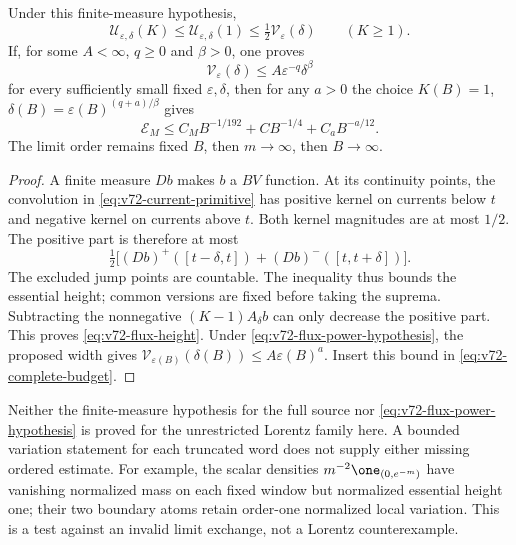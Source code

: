 \begin{proposition}
\label{prop:v72-flux-height}
Under this finite-measure hypothesis,
\begin{equation}\label{eq:v72-flux-height}
 \mathcal U_{\varepsilon,\delta}(K)
           \le\mathcal U_{\varepsilon,\delta}(1)
           \le\tfrac12\mathcal V_\varepsilon(\delta)
                  \qquad(K\ge1).
\end{equation}
If, for some $A<\infty$, $q\ge0$ and $\beta>0$, one proves
\begin{equation}\label{eq:v72-flux-power-hypothesis}
 \mathcal V_\varepsilon(\delta)
                  \le A\varepsilon^{-q}\delta^\beta
\end{equation}
for every sufficiently small fixed $\varepsilon,\delta$, then
for any $a>0$ the choice
$K(B)=1$, $\delta(B)=\varepsilon(B)^{(q+a)/\beta}$ gives
\begin{equation}\label{eq:v72-flux-power-consequence}
 \mathcal E_M\le C_MB^{-1/192}+CB^{-1/4}+C_aB^{-a/12}.
\end{equation}
The limit order remains fixed $B$, then $m\to\infty$, then
$B\to\infty$.
\end{proposition}
\begin{proof}
A finite measure $Db$ makes $b$ a $BV$ function. At its continuity
points, the convolution in \eqref{eq:v72-current-primitive} has
positive kernel on currents below $t$ and negative kernel on currents
above $t$. Both kernel magnitudes are at most $1/2$. The positive
part is therefore at most
\[
 \tfrac12\bigl[(Db)^+([t-\delta,t])+(Db)^-([t,t+\delta])\bigr].
\]
The excluded jump points are countable. The inequality thus bounds
the essential height; common versions are fixed before taking the
suprema. Subtracting the nonnegative $(K-1)A_\delta b$ can only
decrease the positive part. This proves \eqref{eq:v72-flux-height}.
Under \eqref{eq:v72-flux-power-hypothesis}, the proposed width gives
$\mathcal V_{\varepsilon(B)}(\delta(B))\le A\varepsilon(B)^a$.
Insert this bound in \eqref{eq:v72-complete-budget}.
\end{proof}

Neither the finite-measure hypothesis for the full source nor
\eqref{eq:v72-flux-power-hypothesis} is proved for the unrestricted
Lorentz family here. A bounded variation statement for each truncated
word does not supply either missing ordered estimate. For example,
the scalar densities
$m^{-2}\one_{(0,e^{-m})}$ have vanishing normalized mass on each
fixed window but normalized essential height one; their two boundary
atoms retain order-one normalized local variation. This is a test
against an invalid limit exchange, not a Lorentz counterexample.


